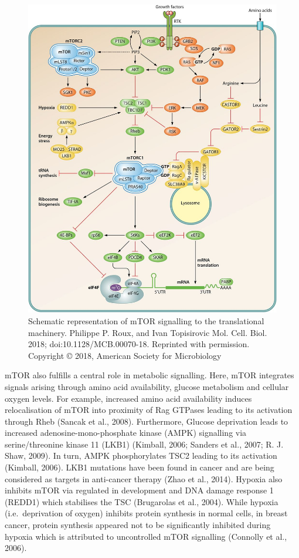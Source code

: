 \documentclass[
  12pt,
  openany]{book}
\begin{document}
\begin{figure}[ht]
 \centering
  \includegraphics{./figures/mTORsignal.jpg}
  \caption{Schematic representation of mTOR signalling to the translational machinery. Philippe P. Roux, and Ivan Topisirovic Mol. Cell. Biol. 2018; doi:10.1128/MCB.00070-18. Reprinted with permission. Copyright © 2018, American Society for Microbiology
 \label{fig:mtorsignal}}
\end{figure}

mTOR also fulfills a central role in metabolic signalling. Here, mTOR integrates signals arising through amino acid availability, glucose metabolism and cellular oxygen levels. For example, increased amino acid availability induces relocalisation of mTOR into proximity of Rag GTPases leading to its activation through Rheb (Sancak et al., 2008). Furthermore, Glucose deprivation leads to increased adenosine-mono-phosphate kinase (AMPK) signalling via serine/threonine kinase 11 (LKB1) (Kimball, 2006; Sanders et al., 2007; R. J. Shaw, 2009). In turn, AMPK phosphorylates TSC2 leading to its activation (Kimball, 2006). LKB1 mutations have been found in cancer and are being considered as targets in anti-cancer therapy (Zhao et al., 2014). Hypoxia also inhibits mTOR via regulated in development and DNA damage response 1 (REDD1) which stabilises the TSC (Brugarolas et al., 2004). While hypoxia (i.e.~deprivation of oxygen) inhibits protein synthesis in normal cells, in breast cancer, protein synthesis appeared not to be significantly inhibited during hypoxia which is attributed to uncontrolled mTOR signalling (Connolly et al., 2006).
\end{document}
